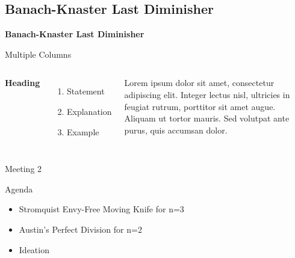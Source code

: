 \documentclass[aspectratio=169,xcolor=dvipsnames]{beamer}
\begin{document}
\subsection{Banach-Knaster Last Diminisher}
\begin{frame}
	\Huge{\centerline{\textbf{Banach-Knaster Last Diminisher}}}
\end{frame}
\begin{frame}{Multiple Columns}
	\begin{columns}[c] %
		
		\textbf{Heading}
		\begin{enumerate}
			\item Statement
			\item Explanation
			\item Example
		\end{enumerate}
		
		Lorem ipsum dolor sit amet, consectetur adipiscing elit. Integer lectus nisl, ultricies in feugiat rutrum, porttitor sit amet augue. Aliquam ut tortor mauris. Sed volutpat ante purus, quis accumsan dolor.
		
	\end{columns}
\end{frame}
\begin{frame}{Meeting 2}
	\begin{block}{Agenda}
		\begin{itemize}
			\item Stromquist Envy-Free Moving Knife for n=3
			\item Austin's Perfect Division for n=2
			\item Ideation
		\end{itemize}
	\end{block}
\end{frame}
\end{document}

